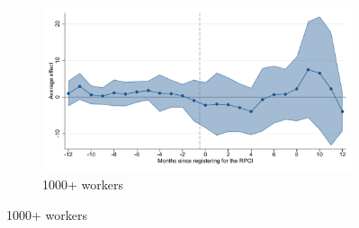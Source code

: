 \begin{figure}[H]
    \begin{subfigure}{0.32\textwidth}
    \caption{1000+ workers}
    \includegraphics[width=\textwidth]{04_Figures/muestra_10porciento/event_study_sal_formal_size_1001_dcdh_connected.pdf}
    \end{subfigure}
    
\end{figure}

\clearpage


